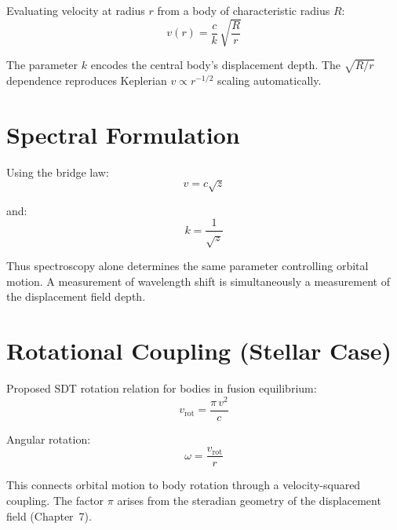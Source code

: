 Evaluating velocity at radius $r$ from a body of characteristic radius $R$:
\begin{equation}\label{eq:v-of-r}
  v(r) = \frac{c}{k}\,\sqrt{\frac{R}{r}}
\end{equation}

The parameter $k$ encodes the central body's displacement depth.  The $\sqrt{R/r}$ dependence reproduces Keplerian $v \propto r^{-1/2}$ scaling automatically.


\section{Spectral Formulation}
\label{sec:spectral}

Using the bridge law:
\begin{equation}\label{eq:v-from-z}
  v = c\sqrt{z}
\end{equation}

and:
\begin{equation}\label{eq:k-from-z}
  k = \frac{1}{\sqrt{z}}
\end{equation}

Thus spectroscopy alone determines the same parameter controlling orbital motion.  A measurement of wavelength shift is simultaneously a measurement of the displacement field depth.


\section{Rotational Coupling (Stellar Case)}
\label{sec:rotation}

Proposed SDT rotation relation for bodies in fusion equilibrium:
\begin{equation}\label{eq:rotation}
  v_{\text{rot}} = \frac{\pi\,v^2}{c}
\end{equation}

Angular rotation:
\begin{equation}\label{eq:omega-rot}
  \omega = \frac{v_{\text{rot}}}{r}
\end{equation}

This connects orbital motion to body rotation through a velocity-squared coupling.  The factor $\pi$ arises from the steradian geometry of the displacement field (Chapter~7).


